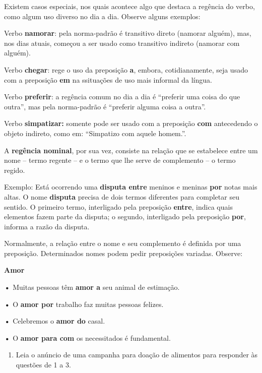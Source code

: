 \begin{itemize}
\begin{itemize}
{\begin{itemize}
\begin{itemize}
{Existem casos especiais, nos quais acontece algo que destaca a regência
do verbo, como algum uso diverso no dia a dia. Observe alguns exemplos:

Verbo \textbf{namorar}: pela norma-padrão é transitivo direto (namorar
alguém), mas, nos dias atuais, começou a ser usado como transitivo
indireto (namorar com alguém).

Verbo \textbf{chegar}: rege o uso da preposição \textbf{a}, embora,
cotidianamente, seja usado com a preposição \textbf{em} na ssituações de
uso mais informal da língua.

Verbo \textbf{preferir}: a regência comum no dia a dia é ``preferir uma
coisa do que outra'', mas pela norma-padrão é ``preferir alguma coisa a
outra''.

Verbo \textbf{simpatizar:} somente pode ser usado com a preposição
\textbf{com} antecedendo o objeto indireto, como em: ``Simpatizo com
aquele homem.''.

A \textbf{regência nominal}, por sua vez, consiste na relação que se
estabelece entre um nome -- termo regente -- e o termo que lhe serve de
complemento -- o termo regido.

Exemplo: Está ocorrendo uma \textbf{disputa entre} meninos e meninas
\textbf{por} notas mais altas. O nome \textbf{disputa} precisa de dois
termos diferentes para completar seu sentido. O primeiro termo,
interligado pela preposição \textbf{entre}, indica quais elementos fazem
parte da disputa; o segundo, interligado pela preposição \textbf{por},
informa a razão da disputa.

Normalmente, a relação entre o nome e seu complemento é definida por uma
preposição. Determinados nomes podem pedir preposições variadas.
Observe:

\textbf{Amor}

\textbf{•} Muitas pessoas têm \textbf{amor a} seu animal de estimação.

\textbf{•} O \textbf{amor por} trabalho faz muitas pessoas felizes.

\textbf{•} Celebremos o \textbf{amor do} casal.

\textbf{•} O \textbf{amor para com} os necessitados é fundamental.
}


\begin{enumerate}
\def\labelenumi{\arabic{enumi}.}
\tightlist
\item
  Leia o anúncio de uma campanha para doação de alimentos para responder
  às questões de 1 a 3.
\end{enumerate}


\end{itemize}
\end{itemize}}
\end{itemize}
\end{itemize}
